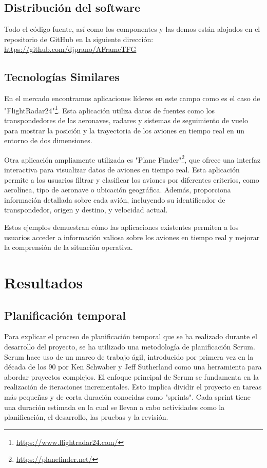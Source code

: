 \documentclass[a4paper, 11pt]{book}
\begin{document}
\section{Distribución del software}
\label{sec:planificacion-temporal}
Todo el código fuente, así como los componentes y las demos están alojados en el repositorio de GitHub en la siguiente dirección: \url{https://github.com/djprano/AFrameTFG}
\section{Tecnologías Similares}
\label{sec:tecnosimilares}
En el mercado encontramos aplicaciones líderes en este campo como es el caso de "FlightRadar24"\footnote{\url{https://www.flightradar24.com/}}. Esta aplicación utiliza datos de fuentes como los transpondedores de las aeronaves, radares y sistemas de seguimiento de vuelo para mostrar la posición y la trayectoria de los aviones en tiempo real en un entorno de dos dimensiones.

Otra aplicación ampliamente utilizada es "Plane Finder"\footnote{\url{https://planefinder.net/}}, que ofrece una interfaz interactiva para visualizar datos de aviones en tiempo real. Esta aplicación permite a los usuarios filtrar y clasificar los aviones por diferentes criterios, como aerolínea, tipo de aeronave o ubicación geográfica. Además, proporciona información detallada sobre cada avión, incluyendo su identificador de transpondedor, origen y destino, y velocidad actual.

Estos ejemplos demuestran cómo las aplicaciones existentes permiten a los usuarios acceder a información valiosa sobre los aviones en tiempo real y mejorar la comprensión de la situación operativa.


\clearpage
\chapter{Resultados}
\label{chap:resultados}
\section{Planificación temporal}
Para explicar el proceso de planificación temporal que se ha realizado durante el desarrollo del proyecto, se ha utilizado una metodología de planificación Scrum.
Scrum hace uso de un marco de trabajo ágil, introducido por primera vez en la década de los 90 por Ken Schwaber y Jeff Sutherland como una herramienta para abordar proyectos complejos.
El enfoque principal de Scrum se fundamenta en la realización de iteraciones incrementales. Esto implica dividir el proyecto en tareas más pequeñas y de corta duración conocidas como "sprints". Cada sprint tiene una duración estimada en la cual se llevan a cabo actividades como la planificación, el desarrollo, las pruebas y la revisión.
\end{document}
